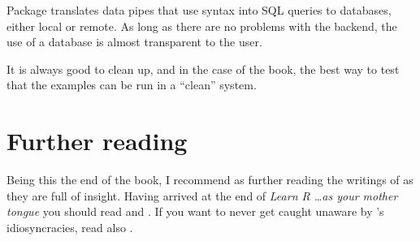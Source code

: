 \documentclass[krantz2]{krantz}\usepackage{knitr}%
\begin{document}
\begin{explainbox}
Package  translates data pipes that use  syntax into SQL queries to databases, either local or remote. As long as there are no problems with the backend, the use of a database is almost transparent to the \Rlang user.
\end{explainbox}

\begin{infobox}
It is always good to clean up, and in the case of the book, the best way to test that the examples
can be run in a ``clean'' system.

\begin{knitrout}\footnotesize
{}\color{fgcolor}\begin{kframe}
\begin{alltt}
\hlstd{(}\hlstd{,}  \hlstd{=} \hlstd{)}
\hlstd{(}\hlstd{,}  \hlstd{=} \hlstd{)}
\end{alltt}
\end{kframe}
\end{knitrout}
\end{infobox}

\section{Further reading}
Being this the end of the book, I recommend as further reading the writings of \citeauthor{Burns1998} as they are full of insight. Having arrived at the end of \emph{Learn R \ldots as your mother tongue} you should read  \autocite{Burns1998} and  \autocite{Burns2012}. If you want to never get caught unaware by \Rlang's idiosyncracies, read also  \autocite{Burns2011}.
\end{document}
